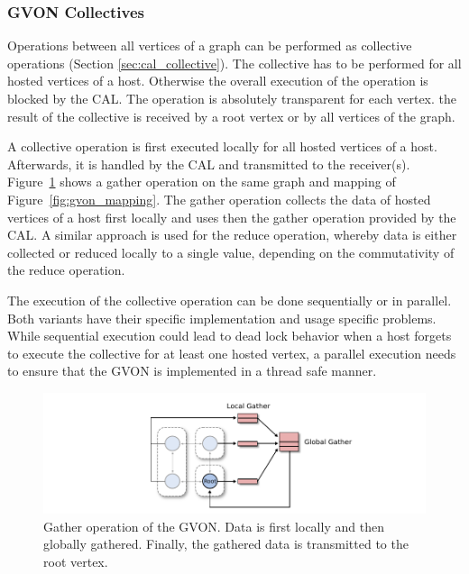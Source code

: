 \subsubsection*{GVON Collectives}
\label{sec:design:gvon_collectives}
Operations between all vertices of a graph can be performed as
collective operations (Section \ref{sec:cal_collective}).  The
collective has to be performed for all hosted vertices of a
host. Otherwise the overall execution of the operation is blocked by
the CAL. The operation is absolutely transparent for each vertex.  the
result of the collective is received by a root vertex or by all
vertices of the graph.

A collective operation is first executed locally for all hosted
vertices of a host. Afterwards, it is handled by the CAL and
transmitted to the receiver(s). Figure~\ref{fig:gvon_collective} shows
a gather operation on the same graph and mapping of
Figure~\ref{fig:gvon_mapping}. The gather operation collects the data
of hosted vertices of a host first locally and uses then the gather
operation provided by the CAL. A similar approach is used for the
reduce operation, whereby data is either collected or reduced locally
to a single value, depending on the commutativity of the reduce
operation.

The execution of the collective operation can be done sequentially or in
parallel. Both variants have their specific implementation and usage
specific problems. While sequential execution could lead to dead lock behavior
when a host forgets to execute the collective for at least one hosted vertex,
a parallel execution needs to ensure that the GVON is implemented in
a thread safe manner.

\begin{figure}[H]
  \centering \includegraphics[width=\textwidth]{graphics/30_gvon_collective}
  \caption{Gather operation of the GVON. Data is first locally and
    then globally gathered. Finally, the gathered data is transmitted
    to the root vertex.}
  \label{fig:gvon_collective}
\end{figure}


